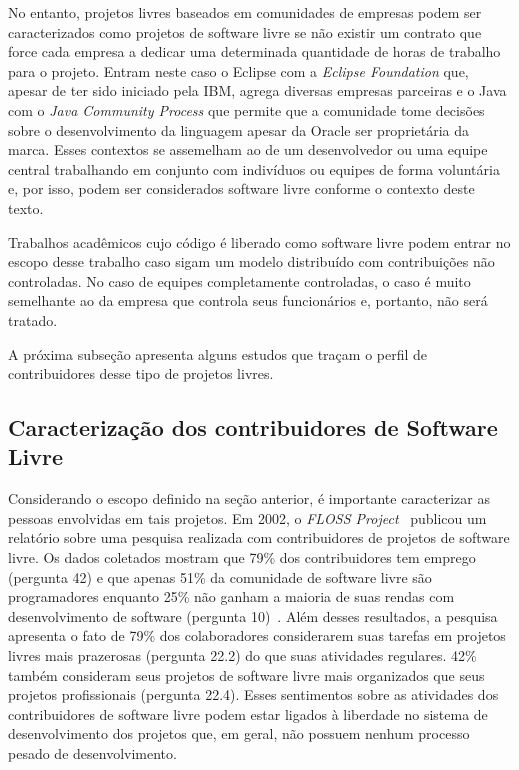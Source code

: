 No entanto, projetos livres baseados em comunidades de empresas podem
ser caracterizados como projetos de software livre se não existir um
contrato que force cada empresa a dedicar uma determinada quantidade
de horas de trabalho para o projeto. Entram neste caso o Eclipse com a
\emph{Eclipse Foundation} que, apesar de ter sido iniciado pela IBM,
agrega diversas empresas parceiras e o Java com o \emph{Java Community
  Process} que permite que a comunidade tome decisões sobre o
desenvolvimento da linguagem apesar da Oracle ser proprietária da
marca. Esses contextos se assemelham ao de um desenvolvedor ou uma
equipe central trabalhando em conjunto com indivíduos ou equipes de
forma voluntária e, por isso, podem ser considerados software livre
conforme o contexto deste texto.

Trabalhos acadêmicos cujo código é liberado como software livre podem
entrar no escopo desse trabalho caso sigam um modelo distribuído com
contribuições não controladas. No caso de equipes completamente
controladas, o caso é muito semelhante ao da empresa que controla seus
funcionários e, portanto, não será tratado.

A próxima subseção apresenta alguns estudos que traçam o perfil de
contribuidores desse tipo de projetos livres.

\subsection{Caracterização dos contribuidores de Software Livre}
\label{subsec:caracterizacao}

Considerando o escopo definido na seção anterior, é importante
caracterizar as pessoas envolvidas em tais projetos. Em 2002, o
\emph{FLOSS Project}~\cite{FlossProject} publicou um relatório sobre
uma pesquisa realizada com contribuidores de projetos de software
livre. Os dados coletados mostram que 79\% dos contribuidores tem
emprego (pergunta 42) e que apenas 51\% da comunidade de software
livre são programadores enquanto 25\% não ganham a maioria de suas
rendas com desenvolvimento de software (pergunta
10)~\cite{FlossStats}. Além desses resultados, a pesquisa apresenta o
fato de 79\% dos colaboradores considerarem suas tarefas em projetos
livres mais prazerosas (pergunta 22.2) do que suas atividades
regulares. 42\% também consideram seus projetos de software livre mais
organizados que seus projetos profissionais (pergunta 22.4).  Esses
sentimentos sobre as atividades dos contribuidores de software livre
podem estar ligados à liberdade no sistema de desenvolvimento dos
projetos que, em geral, não possuem nenhum processo pesado de
desenvolvimento.

